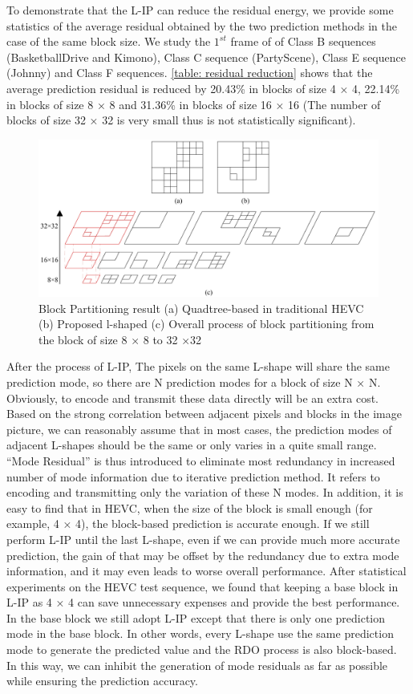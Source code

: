 \documentclass[journal]{IEEEtran}
\begin{document}
To demonstrate that the L-IP can reduce the residual energy, we provide some statistics of the average residual obtained by the two prediction methods in the case of the same block size. We study the $1^{st}$ frame of of Class B sequences (BasketballDrive and Kimono), Class C sequence (PartyScene), Class E sequence (Johnny) and Class F sequences. \autoref{table: residual reduction} shows that the average prediction residual is reduced by 20.43\% in blocks of size 4 × 4, 22.14\% in blocks of size 8 × 8 and 31.36\% in blocks of size 16 × 16 (The number of blocks of size 32 × 32 is very small thus is not statistically significant).

\begin{figure}[tp]
    \centering
    \includegraphics[width=14cm]{pictures/partitioning process.pdf}
    \caption{Block Partitioning result (a) Quadtree-based in traditional HEVC (b) Proposed l-shaped (c) Overall process of block partitioning from the block of size 8 × 8 to 32 ×32}
    \label{fig:partitioning}
\end{figure}
After the process of L-IP, The pixels on the same L-shape will share the same prediction mode, so there are N prediction modes for a block of size N × N. Obviously, to encode and transmit these data directly will be an extra cost. Based on the strong correlation between adjacent pixels and blocks in the image picture, we can reasonably assume that in most cases, the prediction modes of adjacent L-shapes should be the same or only varies in a quite small range. ``Mode Residual'' is thus introduced to eliminate most redundancy in increased number of mode information due to iterative prediction method. It refers to encoding and transmitting only the variation of these N modes. In addition, it is easy to find that in HEVC, when the size of the block is small enough (for example, 4 × 4), the block-based prediction is accurate enough. If we still perform L-IP until the last L-shape, even if we can provide much more accurate prediction, the gain of that may be offset by the redundancy due to extra mode information, and it may even leads to worse overall performance. After statistical experiments on the HEVC test sequence, we found that keeping a base block in L-IP as 4 × 4 can save unnecessary expenses and provide the best performance. In the base block we still adopt L-IP except that there is only one prediction mode in the base block. In other words, every L-shape use the same prediction mode to generate the predicted value and the RDO process is also block-based. In this way, we can inhibit the generation of mode residuals as far as possible while ensuring the prediction accuracy.
\end{document}
